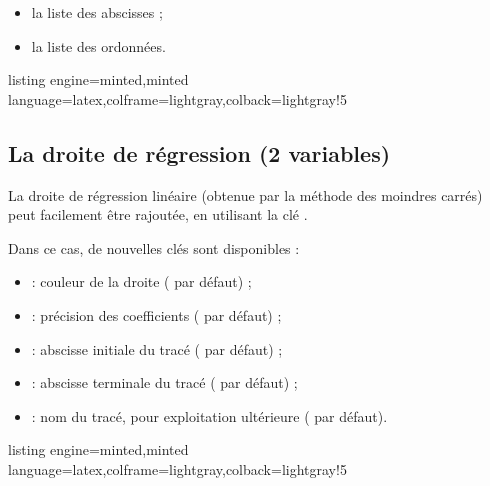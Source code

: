 \documentclass[11pt,a4paper]{ltxdoc}
\begin{document}
\smallskip

\begin{itemize}
	\item la liste des abscisses ;
	\item la liste des ordonnées.
\end{itemize}

\begin{tcblisting}{listing engine=minted,minted language=latex,colframe=lightgray,colback=lightgray!5}
\begin{GraphiqueTikz}%
	[x=0.075cm,y=0.03cm,Xmin=0,Xmax=160,Xgrille=20,Xgrilles=10,
	Origy=250,Ymin=250,Ymax=400,Ygrille=25,Ygrilles=5]
\end{GraphiqueTikz}
\end{tcblisting}

\subsection{La droite de régression (2 variables)}\label{reglin}

La droite de régression linéaire (obtenue par la méthode des moindres carrés) peut facilement être rajoutée, en utilisant la clé .

\smallskip

Dans ce cas, de nouvelles clés sont disponibles :

\smallskip

\begin{itemize}
	\item {} : couleur de la droite ( par défaut) ;
	\item {} : précision des coefficients ( par défaut) ;
	\item {} : abscisse initiale du tracé ( par défaut) ;
	\item {} : abscisse terminale du tracé ( par défaut) ;
	\item {} : nom du tracé, pour exploitation ultérieure ( par défaut).
\end{itemize}

\begin{tcblisting}{listing engine=minted,minted language=latex,colframe=lightgray,colback=lightgray!5}
\begin{GraphiqueTikz}%
	[x=0.075cm,y=0.03cm,Xmin=0,Xmax=160,Xgrille=20,Xgrilles=10,
	Origy=250,Ymin=250,Ymax=400,Ygrille=25,Ygrilles=5]
\end{GraphiqueTikz}
\end{tcblisting}
\end{document}
